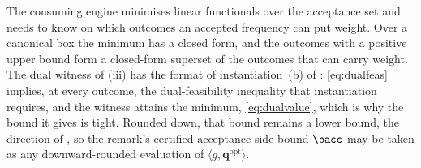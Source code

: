 
The consuming engine minimises linear functionals over the acceptance set and
needs to know on which outcomes an accepted frequency can put weight. Over a
canonical box the minimum has a closed form, and the outcomes with a positive
upper bound form a closed-form superset of the outcomes that can carry weight.
The dual witness of (iii) has the format of instantiation~(b) of
: \eqref{eq:dualfeas} implies, at
every outcome, the dual-feasibility inequality that instantiation requires,
and the witness
attains the minimum, \eqref{eq:dualvalue}, which is why the bound it gives is
tight. Rounded down, that bound remains a lower bound, the direction of
, so the remark's certified
acceptance-side bound $\bacc$ may be taken as any downward-rounded evaluation
of $\langle g,\mathbf{q}^{\mathrm{opt}}\rangle$.


